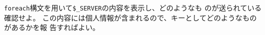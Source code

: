 \begin{Prob}\upshape\Must
 \texttt{foreach}構文を用いて\Verb+$_SERVER+の内容を表示し、どのようなも
 のが送られている確認せよ。
 \ifText
この内容には個人情報が含まれるので、キーとしてどのようなものがあるかを報
 告すればよい。
 \fi
\end{Prob}
